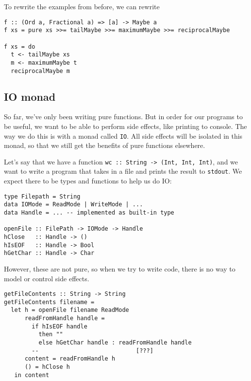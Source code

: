 \documentclass[class=scrartcl]{standalone}
\begin{document}
\begin{example}
  To rewrite the examples from before, we can rewrite
  \begin{verbatim}
f :: (Ord a, Fractional a) => [a] -> Maybe a
f xs = pure xs >>= tailMaybe >>= maximumMaybe >>= reciprocalMaybe

f xs = do
  t <- tailMaybe xs
  m <- maximumMaybe t
  reciprocalMaybe m
  \end{verbatim}
\end{example}


\subsection{IO monad}
So far, we've only been writing pure functions.
But in order for our programs to be useful,
we want to be able to perform side effects, like printing to console.
The way we do this is with a monad called \texttt{IO}.
All side effects will be isolated in this monad,
so that we still get the benefits of pure functions elsewhere.

Let's say that we have a function
\texttt{wc :: String -> (Int, Int, Int)}, %
and we want to write a program that takes in a file
and prints the result to \texttt{stdout}.
We expect there to be types and functions to help us do IO:\@
\begin{verbatim}
type Filepath = String
data IOMode = ReadMode | WriteMode | ...
data Handle = ... -- implemented as built-in type

openFile :: FilePath -> IOMode -> Handle
hClose   :: Handle -> ()
hIsEOF   :: Handle -> Bool
hGetChar :: Handle -> Char
\end{verbatim}

However, these are not pure, so when we try to write code,
there is no way to model or control side effects.
\begin{verbatim}
getFileContents :: String -> String
getFileContents filename =
  let h = openFile filename ReadMode
      readFromHandle handle =
        if hIsEOF handle
          then ""
          else hGetChar handle : readFromHandle handle
        --                            [???]
      content = readFromHandle h
      () = hClose h
   in content
\end{verbatim}
\end{document}
